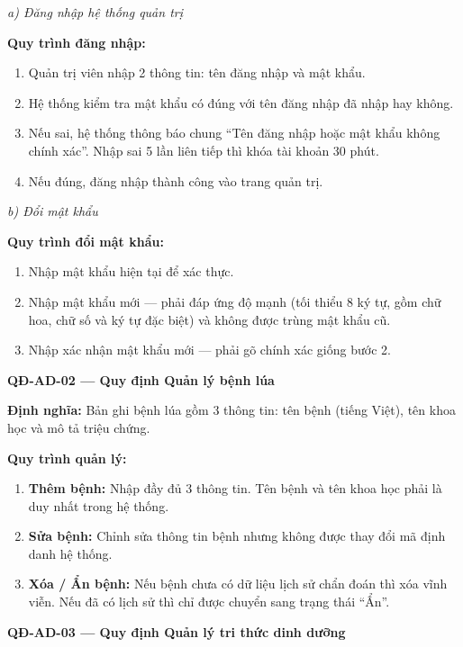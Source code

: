 \documentclass[12pt,a4paper]{article}
\begin{document}
\noindent\textit{a) Đăng nhập hệ thống quản trị}

\noindent\textbf{Quy trình đăng nhập:}
\begin{enumerate}
    \item Quản trị viên nhập 2 thông tin: tên đăng nhập và mật khẩu.
    \item Hệ thống kiểm tra mật khẩu có đúng với tên đăng nhập đã nhập hay không.
    \item Nếu sai, hệ thống thông báo chung ``Tên đăng nhập hoặc mật khẩu không chính xác''. Nhập sai 5 lần liên tiếp thì khóa tài khoản 30 phút.
    \item Nếu đúng, đăng nhập thành công vào trang quản trị.
\end{enumerate}

\noindent\textit{b) Đổi mật khẩu}

\noindent\textbf{Quy trình đổi mật khẩu:}
\begin{enumerate}
    \item Nhập mật khẩu hiện tại để xác thực.
    \item Nhập mật khẩu mới --- phải đáp ứng độ mạnh (tối thiểu 8 ký tự, gồm chữ hoa, chữ số và ký tự đặc biệt) và không được trùng mật khẩu cũ.
    \item Nhập xác nhận mật khẩu mới --- phải gõ chính xác giống bước 2.
\end{enumerate}

\vspace{0.3cm}
\noindent\textbf{QĐ-AD-02 --- Quy định Quản lý bệnh lúa}

\noindent\textbf{Định nghĩa:} Bản ghi bệnh lúa gồm 3 thông tin: tên bệnh (tiếng Việt), tên khoa học và mô tả triệu chứng.

\noindent\textbf{Quy trình quản lý:}
\begin{enumerate}
    \item \textbf{Thêm bệnh:} Nhập đầy đủ 3 thông tin. Tên bệnh và tên khoa học phải là duy nhất trong hệ thống.
    \item \textbf{Sửa bệnh:} Chỉnh sửa thông tin bệnh nhưng không được thay đổi mã định danh hệ thống.
    \item \textbf{Xóa / Ẩn bệnh:} Nếu bệnh chưa có dữ liệu lịch sử chẩn đoán thì xóa vĩnh viễn. Nếu đã có lịch sử thì chỉ được chuyển sang trạng thái ``Ẩn''.
\end{enumerate}

\vspace{0.3cm}
\noindent\textbf{QĐ-AD-03 --- Quy định Quản lý tri thức dinh dưỡng}
\end{document}
